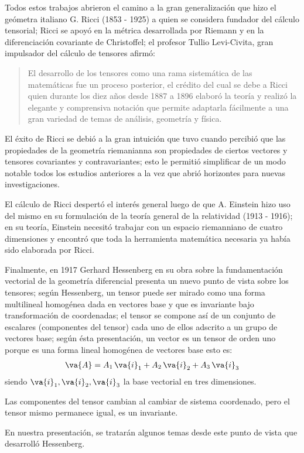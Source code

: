 \par
 Todos estos trabajos abrieron el camino a la gran generalización que hizo el geómetra italiano G. Ricci (1853 - 1925) a quien se considera fundador del cálculo tensorial; Ricci se apoyó en la métrica desarrollada por Riemann y en la diferenciación covariante de Christoffel; el profesor Tullio Levi-Civita, gran impulsador del cálculo de tensores afirmó: \blockquote{El desarrollo de los tensores como una rama sistemática de las matemáticas fue un proceso posterior, el crédito del cual se debe a Ricci quien durante los diez años desde 1887 a 1896 elaboró la teoría y realizó la elegante y comprensiva notación que permite adaptarla fácilmente a una gran variedad de temas de análisis, geometría y física.}
 \par
 El éxito de Ricci se debió a la gran intuición que tuvo cuando percibió que las propiedades de la geometría riemanianna son propiedades de ciertos vectores y tensores covariantes y contravariantes; esto le permitió simplificar de un modo notable todos los estudios anteriores a la vez que abrió horizontes para nuevas investigaciones.
 \par
El cálculo de Ricci despertó el interés general luego de que A. Einstein hizo uso del mismo en su formulación de la teoría general de la relatividad (1913 - 1916); en su teoría, Einstein necesitó trabajar con un espacio riemanniano de cuatro
dimensiones y encontró que toda la herramienta matemática necesaria ya había sido elaborada por Ricci.
\par
Finalmente, en 1917 Gerhard Hessenberg en su obra sobre la fundamentación vectorial de la geometría diferencial presenta un nuevo punto de vista sobre los tensores; según Hessenberg, un tensor puede ser mirado como una forma multilineal
homogénea dada en vectores base y que es invariante bajo transformación de coordenadas; el tensor se compone así de un conjunto de escalares (componentes del tensor) cada uno de ellos adscrito a un grupo de vectores base; según ésta presentación, un vector es un tensor de orden uno porque es una forma lineal homogénea de vectores base esto es:
\begin{align*}
\va{A} =  A_{1} \, \va{i}_{1} + A_{2} \, \va{i}_{2} + A_{3} \, \va{i}_{3}
\end{align*}
siendo $\va{i}_{1}, \va{i}_{2}, \va{i}_{3}$ la base vectorial en tres dimensiones.
\par
Las componentes del tensor cambian al cambiar de sistema coordenado, pero el tensor mismo permanece igual, es un invariante.
\par
En nuestra presentación, se tratarán algunos temas desde este punto de vista que desarrolló Hessenberg.
\newpage

